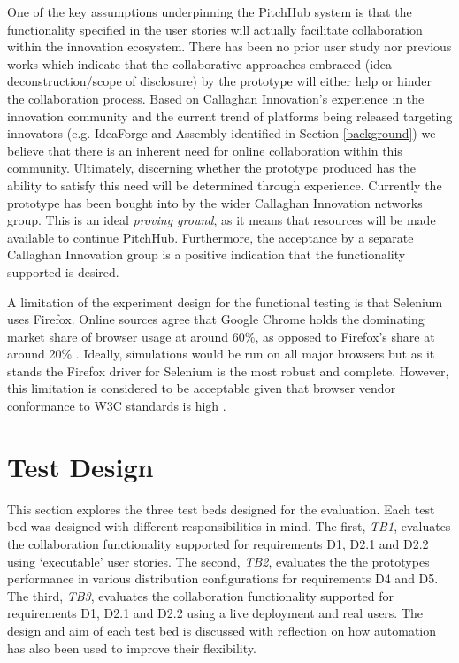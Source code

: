 One of the key assumptions underpinning the PitchHub system is that the functionality specified in the user stories will actually facilitate collaboration within the innovation ecosystem. There has been no prior user study nor previous works which indicate that the collaborative approaches embraced (idea-deconstruction/scope of disclosure) by the prototype will either help or hinder the collaboration process. Based on Callaghan Innovation's experience in the innovation community and the current trend of platforms being released targeting innovators (e.g. IdeaForge and Assembly identified in Section \ref{background}) we believe that there is an inherent need for online collaboration within this community. Ultimately, discerning whether the prototype produced has the ability to satisfy this need will be determined through experience. Currently the prototype has been bought into by the wider Callaghan Innovation networks group. This is an ideal \textit{proving ground}, as it means that resources will be made available to continue PitchHub. Furthermore, the acceptance by a separate Callaghan Innovation group is a positive indication that the functionality supported is desired.

A limitation of the experiment design for the functional testing is that Selenium uses Firefox. Online sources agree that Google Chrome holds the dominating market share of browser usage at around 60\%, as opposed to Firefox's share at around 20\% \cite{Brows6:online}. Ideally, simulations would be run on all major browsers but as it stands the Firefox driver for Selenium is the most robust and complete. However, this limitation is considered to be acceptable given that browser vendor conformance to W3C standards is high \cite{WebB1:online}.

\section{Test Design}
This section explores the three test beds designed for the evaluation. Each test bed was designed with different responsibilities in mind. The first, \textit{TB1}, evaluates the collaboration functionality supported for requirements D1, D2.1 and D2.2 using `executable' user stories. The second, \textit{TB2}, evaluates the the prototypes performance in various distribution configurations for requirements D4 and D5. The third, \textit{TB3}, evaluates the collaboration functionality supported for requirements D1, D2.1 and D2.2 using a live deployment and real users. The design and aim of each test bed is discussed with reflection on how automation has also been used to improve their flexibility.


